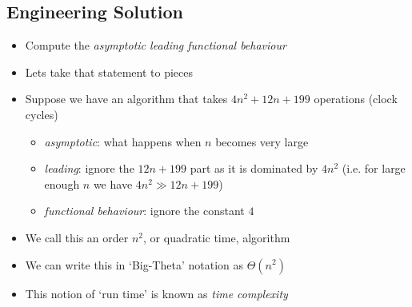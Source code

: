 \begin{slide}
\section{Engineering Solution}

\vspace{-1cm}
\begin{PauseHighLight}
  \begin{itemize}\squeeze
  \item Compute the \emph{asymptotic leading functional behaviour}\pause
  \item Lets take that statement to pieces\pause
  \item Suppose we have an algorithm that takes $4 n^2 + 12 n + 199$
    operations (clock cycles)
    \begin{itemize}
    \item \emph{asymptotic}: what happens when $n$ becomes very
      large\pause
    \item \emph{leading}: ignore the $12 n + 199$ part as it is
      dominated by $4 n^2$ (i.e. for large enough $n$ we have $4 n^2 \gg
      12 n + 199$)\pause
    \item \emph{functional behaviour}: ignore the constant $4$\pause
    \end{itemize}
  \item We call this an order $n^2$, or quadratic time, algorithm\pause
  \item We can write this in `Big-Theta' notation as $\Theta(n^2)$\pause
  \item This notion of `run time' is known as \emph{time complexity} \pause
  \end{itemize}
\end{PauseHighLight}
\vspace{-1cm}

\end{slide}


